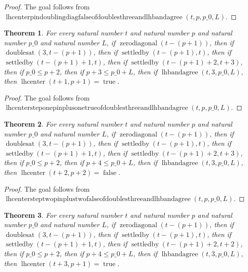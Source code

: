 \documentclass[11pt]{article}
\newtheorem{theorem}{Theorem}[section]
\theoremstyle{definition}
\begin{document}
\begin{proof}
The goal follows from \(\operatorname{lhcenterpindoublingdiagfalseofdoublesthreeandlhbandagree}(t, p, p\_0, L)\).
\end{proof}
\begin{theorem}
\label{ll:paper:lhcenter-step-one-pin-plus-one-true-of-doubles-three-and-lhbandagree}
For every natural number \(t\) and natural number \(p\) and natural number \(p\_0\) and natural number \(L\), if \(\operatorname{zerodiagonal}(t - (p + 1))\), then if \(\operatorname{doublesat}(3, t - (p + 1))\), then if \(\operatorname{settledby}(t - (p + 1), t)\), then if \(\operatorname{settledby}(t - (p + 1) + 1, t)\), then if \(\operatorname{settledby}(t - (p + 1) + 2, t + 3)\), then if \(p\_0 \le p + 2\), then if \(p + 3 \le p\_0 + L\), then if \(\operatorname{lhbandagree}(t, 3, p\_0, L)\), then \(\operatorname{lhcenter}(t + 1, p + 1) = \operatorname{true}\).
\end{theorem}
\begin{proof}
The goal follows from \(\operatorname{lhcentersteponepinplusonetrueofdoublesthreeandlhbandagree}(t, p, p\_0, L)\).
\end{proof}
\begin{theorem}
\label{ll:paper:lhcenter-step-two-pin-plus-two-false-of-doubles-three-and-lhbandagree}
For every natural number \(t\) and natural number \(p\) and natural number \(p\_0\) and natural number \(L\), if \(\operatorname{zerodiagonal}(t - (p + 1))\), then if \(\operatorname{doublesat}(3, t - (p + 1))\), then if \(\operatorname{settledby}(t - (p + 1), t)\), then if \(\operatorname{settledby}(t - (p + 1) + 1, t)\), then if \(\operatorname{settledby}(t - (p + 1) + 2, t + 3)\), then if \(p\_0 \le p + 2\), then if \(p + 4 \le p\_0 + L\), then if \(\operatorname{lhbandagree}(t, 3, p\_0, L)\), then \(\operatorname{lhcenter}(t + 2, p + 2) = \operatorname{false}\).
\end{theorem}
\begin{proof}
The goal follows from \(\operatorname{lhcentersteptwopinplustwofalseofdoublesthreeandlhbandagree}(t, p, p\_0, L)\).
\end{proof}
\begin{theorem}
\label{ll:paper:lhcenter-step-three-pin-plus-one-true-of-doubles-three-and-lhbandagree}
For every natural number \(t\) and natural number \(p\) and natural number \(p\_0\) and natural number \(L\), if \(\operatorname{zerodiagonal}(t - (p + 1))\), then if \(\operatorname{doublesat}(3, t - (p + 1))\), then if \(\operatorname{settledby}(t - (p + 1), t)\), then if \(\operatorname{settledby}(t - (p + 1) + 1, t)\), then if \(\operatorname{settledby}(t - (p + 1) + 2, t + 2)\), then if \(p\_0 \le p + 2\), then if \(p + 4 \le p\_0 + L\), then if \(\operatorname{lhbandagree}(t, 3, p\_0, L)\), then \(\operatorname{lhcenter}(t + 3, p + 1) = \operatorname{true}\).
\end{theorem}
\end{document}
